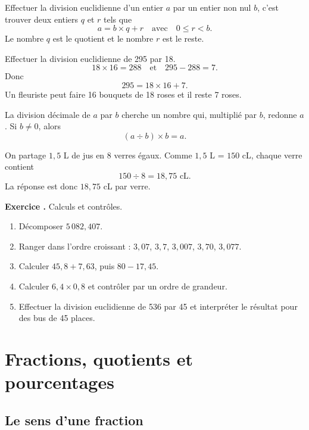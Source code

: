 \documentclass[11pt,a4paper]{article}
\newcounter{exo}
\newcommand{\exercice}[1]{\refstepcounter{exo}\begin{exobox}\textbf{Exercice \theexo.} #1\end{exobox}}
\begin{document}
\begin{definitionbox}
Effectuer la division euclidienne d'un entier \(a\) par un entier non nul \(b\), c'est trouver deux entiers \(q\) et \(r\) tels que
\[
a=b\times q+r \quad \text{avec} \quad 0\leq r<b.
\]
Le nombre \(q\) est le quotient et le nombre \(r\) est le reste.
\end{definitionbox}

\begin{exemplebox}
Effectuer la division euclidienne de 295 par 18.
\[
18\times16=288 \quad \text{et} \quad 295-288=7.
\]
Donc
\[
295=18\times16+7.
\]
Un fleuriste peut faire 16 bouquets de 18 roses et il reste 7 roses.
\end{exemplebox}

\begin{definitionbox}
La division décimale de \(a\) par \(b\) cherche un nombre qui, multiplié par \(b\), redonne \(a\). Si \(b\neq0\), alors
\[
(a\div b)\times b=a.
\]
\end{definitionbox}

\begin{exemplebox}
On partage \(1,5\) L de jus en 8 verres égaux. Comme \(1,5\) L = \(150\) cL, chaque verre contient
\[
150\div8=18,75 \text{ cL}.
\]
La réponse est donc \(18,75\) cL par verre.
\end{exemplebox}

\exercice{Calculs et contrôles.
\begin{enumerate}[label=\alph*)]
\item Décomposer \(5\,082,407\).
\item Ranger dans l'ordre croissant : \(3,07\), \(3,7\), \(3,007\), \(3,70\), \(3,077\).
\item Calculer \(45,8+7,63\), puis \(80-17,45\).
\item Calculer \(6,4\times0,8\) et contrôler par un ordre de grandeur.
\item Effectuer la division euclidienne de 536 par 45 et interpréter le résultat pour des bus de 45 places.
\end{enumerate}}

\section{Fractions, quotients et pourcentages}

\subsection{Le sens d'une fraction}
\end{document}
